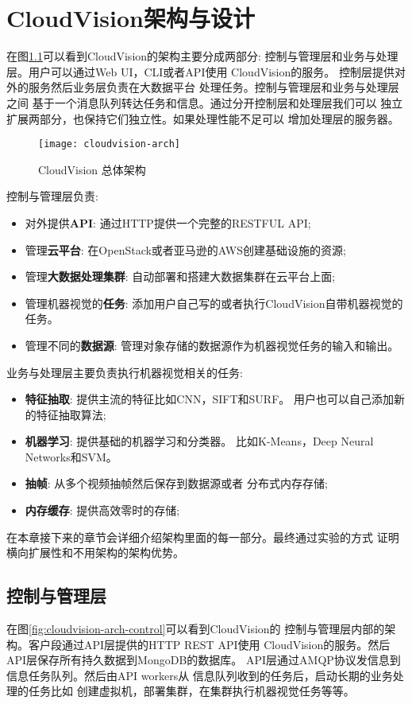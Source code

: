 \chapter{CloudVision架构与设计}
\label{cha:architecture}
在图\ref{fig:cloudvision-arch}可以看到CloudVision的架构主要分成两部分:
控制与管理层和业务与处理层。用户可以通过Web UI，CLI或者API使用
CloudVision的服务。 控制层提供对外的服务然后业务层负责在大数据平台
处理任务。控制与管理层和业务与处理层之间
基于一个消息队列转达任务和信息。通过分开控制层和处理层我们可以
独立扩展两部分，也保持它们独立性。如果处理性能不足可以
增加处理层的服务器。
\begin{figure}[H]
  \centering
  \texttt{[image: cloudvision-arch]}
  \caption{CloudVision 总体架构}
  \label{fig:cloudvision-arch}
\end{figure}

控制与管理层负责:
\begin{itemize}
  \item 对外提供\textbf{API}: 通过HTTP提供一个完整的RESTFUL API;
  \item 管理\textbf{云平台}: 在OpenStack或者亚马逊的AWS创建基础设施的资源;
  \item 管理\textbf{大数据处理集群}: 自动部署和搭建大数据集群在云平台上面;
  \item 管理机器视觉的\textbf{任务}: 添加用户自己写的或者执行CloudVision自带机器视觉的任务。
  \item 管理不同的\textbf{数据源}: 管理对象存储的数据源作为机器视觉任务的输入和输出。
\end{itemize}
业务与处理层主要负责执行机器视觉相关的任务:
\begin{itemize}
  \item \textbf{特征抽取}: 提供主流的特征比如CNN，SIFT和SURF。
        用户也可以自己添加新的特征抽取算法;
  \item \textbf{机器学习}: 提供基础的机器学习和分类器。
        比如K-Means，Deep Neural Networks和SVM。
  \item \textbf{抽帧}: 从多个视频抽帧然后保存到数据源或者
        分布式内存存储;
  \item \textbf{内存缓存}: 提供高效零时的存储;
\end{itemize}

在本章接下来的章节会详细介绍架构里面的每一部分。最终通过实验的方式
证明横向扩展性和不用架构的架构优势。


\section{控制与管理层}
\label{sec:arch_control}
在图\ref{fig:cloudvision-arch-control}可以看到CloudVision的
控制与管理层内部的架构。客户段通过API层提供的HTTP REST API使用
CloudVision的服务。然后API层保存所有持久数据到MongoDB的数据库。
API层通过AMQP协议发信息到信息任务队列。然后由API workers从
信息队列收到的任务后，启动长期的业务处理的任务比如
创建虚拟机，部署集群，在集群执行机器视觉任务等等。


